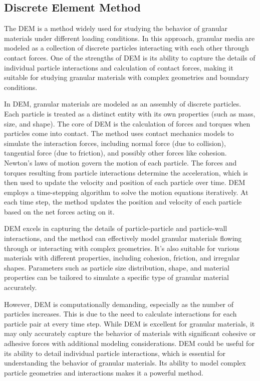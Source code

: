 \subsection{Discrete Element Method}
The DEM is a method widely used for studying the behavior of granular materials under different loading conditions. In this approach, granular media are modeled as a collection of discrete particles interacting with each other through contact forces. One of the strengths of DEM is its ability to capture the details of individual particle interactions and calculation of contact forces, making it suitable for studying granular materials with complex geometries and boundary conditions.

In DEM, granular materials are modeled as an assembly of discrete particles. Each particle is treated as a distinct entity with its own properties (such as mass, size, and shape). The core of DEM is the calculation of forces and torques when particles come into contact. The method uses contact mechanics models to simulate the interaction forces, including normal force (due to collision), tangential force (due to friction), and possibly other forces like cohesion. Newton's laws of motion govern the motion of each particle. The forces and torques resulting from particle interactions determine the acceleration, which is then used to update the velocity and position of each particle over time. DEM employs a time-stepping algorithm to solve the motion equations iteratively. At each time step, the method updates the position and velocity of each particle based on the net forces acting on it. 

DEM excels in capturing the details of particle-particle and particle-wall interactions, and the method can effectively model granular materials flowing through or interacting with complex geometries. It's also suitable for various materials with different properties, including cohesion, friction, and irregular shapes. Parameters such as particle size distribution, shape, and material properties can be tailored to simulate a specific type of granular material accurately.

However, DEM is computationally demanding, especially as the number of particles increases. This is due to the need to calculate interactions for each particle pair at every time step. While DEM is excellent for granular materials, it may only accurately capture the behavior of materials with significant cohesive or adhesive forces with additional modeling considerations. DEM could be useful for its ability to detail individual particle interactions, which is essential for understanding the behavior of granular materials. Its ability to model complex particle geometries and interactions makes it a powerful method. 

